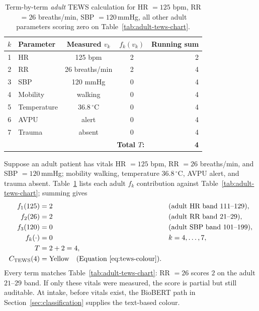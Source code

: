 \begin{table}[H]
\centering
\small
\begin{tabular}{|c|l|c|c|r|}
\hline
\(k\) & Parameter & Measured \(v_k\) & \(f_k(v_k)\) & Running sum \\
\hline
1 & HR & 125 bpm & 2 & 2 \\
2 & RR & 26 breaths/min & 2 & 4 \\
3 & SBP & 120 mmHg & 0 & 4 \\
4 & Mobility & walking & 0 & 4 \\
5 & Temperature & \(36.8\,^\circ\mathrm{C}\) & 0 & 4 \\
6 & AVPU & alert & 0 & 4 \\
7 & Trauma & absent & 0 & 4 \\
\hline
\multicolumn{4}{r}{\textbf{Total \(T\):}} & \textbf{4} \\
\hline
\end{tabular}
\caption{Term-by-term \emph{adult} TEWS calculation for HR \(=125\) bpm, RR \(=26\) breaths/min, SBP \(=120\)\,mmHg, all other adult parameters scoring zero on Table~\ref{tab:adult-tews-chart}.}
\label{tab:tews-worked}
\end{table}

\begin{example}
Suppose an adult patient has vitals HR \(=125\) bpm, RR \(=26\) breaths/min, and SBP \(=120\)\,mmHg; mobility walking, temperature \(36.8\,^\circ\mathrm{C}\), AVPU alert, and trauma absent. Table~\ref{tab:tews-worked} lists each adult \(f_k\) contribution against Table~\ref{tab:adult-tews-chart}; summing gives
\begin{align*}
  f_1(125) &= 2 && \text{(adult HR band }111\text{--}129), \\
  f_2(26)  &= 2 && \text{(adult RR band }21\text{--}29), \\
  f_3(120) &= 0 && \text{(adult SBP band }101\text{--}199), \\
  f_k(\cdot) &= 0 && k=4,\ldots,7, \\
  T &= 2+2 = 4, \\
  C_{\mathrm{TEWS}}(4) &= \text{Yellow} \quad \text{(Equation~\eqref{eq:tews-colour})}.
\end{align*}
Every term matches Table~\ref{tab:adult-tews-chart}: RR \(=26\) scores \(2\) on the adult \(21\)--\(29\) band. If only these vitals were measured, the score is partial but still auditable. At intake, before vitals exist, the BioBERT path in Section~\ref{sec:classification} supplies the text-based colour.
\end{example}

